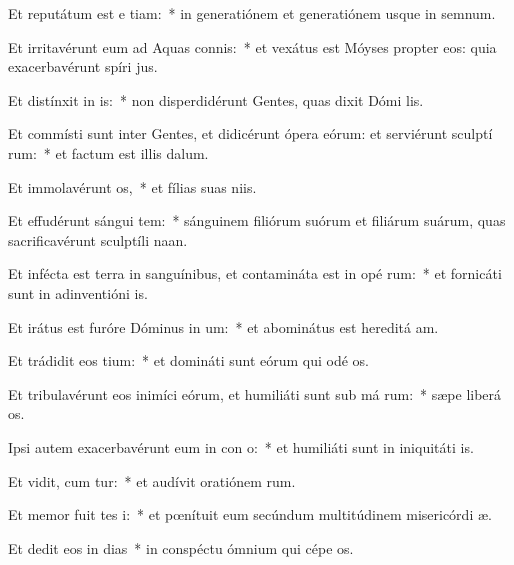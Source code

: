 \item Et reputátum est e  tiam:~* in generatiónem et generatiónem usque in semnum.
\item Et irritavérunt eum ad Aquas connis:~* et vexátus est Móyses propter eos: quia exacerbavérunt spíri jus.
\item Et distínxit in  is:~* non disperdidérunt Gentes, quas dixit Dómi lis.
\item Et commísti sunt inter Gentes, et didicérunt ópera eórum: et serviérunt sculptí rum:~* et factum est illis  dalum.
\item Et immolavérunt  os,~* et fílias suas niis.
\item Et effudérunt sángui tem:~* sánguinem filiórum suórum et filiárum suárum, quas sacrificavérunt sculptíli naan.
\item Et infécta est terra in sanguínibus, et contamináta est in opé rum:~* et fornicáti sunt in adinventióni is.
\item Et irátus est furóre Dóminus in  um:~* et abominátus est hereditá am.
\item Et trádidit eos   tium:~* et domináti sunt eórum qui odé os.
\item Et tribulavérunt eos inimíci eórum, et humiliáti sunt sub má rum:~* sæpe liberá os.
\item Ipsi autem exacerbavérunt eum in con o:~* et humiliáti sunt in iniquitáti is.
\item Et vidit, cum tur:~* et audívit oratiónem rum.
\item Et memor fuit tes i:~* et pœnítuit eum secúndum multitúdinem misericórdi æ.
\item Et dedit eos in dias~* in conspéctu ómnium qui cépe os.

